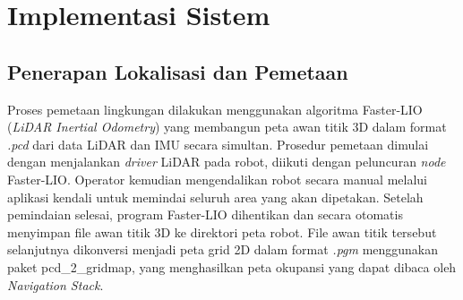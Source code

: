 


\section{Implementasi Sistem}

\subsection{Penerapan Lokalisasi dan Pemetaan}

Proses pemetaan lingkungan dilakukan menggunakan algoritma Faster-LIO (\textit{LiDAR Inertial Odometry}) yang membangun peta awan titik 3D dalam format \textit{.pcd} dari data LiDAR dan IMU secara simultan. Prosedur pemetaan dimulai dengan menjalankan \textit{driver} LiDAR pada robot, diikuti dengan peluncuran \textit{node} Faster-LIO. Operator kemudian mengendalikan robot secara manual melalui aplikasi kendali untuk memindai seluruh area yang akan dipetakan. Setelah pemindaian selesai, program Faster-LIO dihentikan dan secara otomatis menyimpan file awan titik 3D ke direktori peta robot. File awan titik tersebut selanjutnya dikonversi menjadi peta grid 2D dalam format \textit{.pgm} menggunakan paket pcd\_2\_gridmap, yang menghasilkan peta okupansi yang dapat dibaca oleh \textit{Navigation Stack}.

